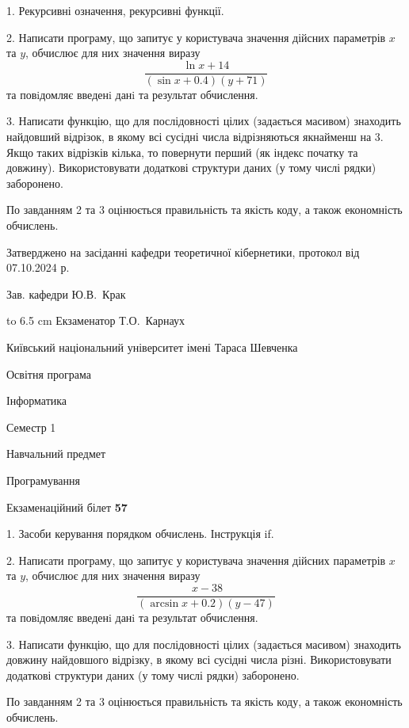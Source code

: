 \documentclass[12pt, ukrainian]{article}
\begin{document}
{%
1. Рекурсивні означення, рекурсивні функції.%
\par
2. Написати програму, що запитує у користувача значення дійсних параметрів $x$ та $y$, обчислює для них значення виразу 
$$\frac{\ln x + 14}{(\sin x + 0.4) (y + 71)}$$ 
та повiдомляє введенi данi та результат обчислення.

\par
3. Написати функцію, що для послідовності цілих (задається масивом) знаходить найдовший відрізок, в якому всі сусідні числа відрізняються якнайменш на 3. Якщо таких відрізків кілька, то повернути перший (як індекс початку та довжину). Використовувати додаткові структури даних (у тому числі рядки) заборонено.

По завданням 2 та 3 оцінюється правильність та якість коду, а також економність обчислень.

}
{\smallskip\smallskip \begin {scriptsize} Затверджено на засіданні кафедри теоретичної кібернетики, протокол   від   07.10.2024 р.\par\smallskip\smallskip\smallskip\smallskip
{\parbox {6.5 cm} {Зав. кафедри \dotfill Ю.В.~Крак}}\hspace {0.7cm} {\hbox to 6.5 cm { Екзаменатор \dotfill Т.О.~Карнаух}} \end{scriptsize}}
\vspace{0.9cm}
{{\begin {scriptsize}\par
{ \center  Київський національний університет імені Тараса Шевченка \par}
{\parbox {5 cm}{Освітня програма \hfill}{\parbox {7 cm}{Інформатика\hfill}}\parbox {6 cm}{\hfill Семестр 1}}\par
{\parbox {5 cm} {Навчальний предмет \hfill}\parbox {7 cm}{Програмування \hfill}\parbox {6cm}{\hfill}\par}\vspace{-15pt} \end{scriptsize}}{\center Екзаменаційний білет \No \textbf { 57 }\par}}
{%
1. Засоби керування порядком обчислень. Інструкція if.%
\par
2. Написати програму, що запитує у користувача значення дійсних параметрів $x$ та $y$, обчислює для них значення виразу 
$$\frac{\ x - 38}{(\arcsin x + 0.2) (y - 47)}$$ 
та повiдомляє введенi данi та результат обчислення.

\par
3. Написати функцію, що для послідовності цілих (задається масивом) знаходить довжину найдовшого відрізку, в якому всі сусідні числа різні. Використовувати додаткові структури даних (у тому числі рядки) заборонено.

По завданням 2 та 3 оцінюється правильність та якість коду, а також економність обчислень.

}
\end{document}
